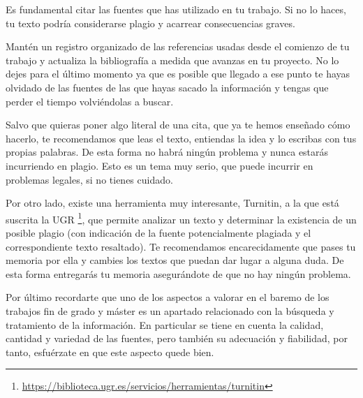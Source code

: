 Es fundamental citar las fuentes que has utilizado en tu trabajo. Si no lo haces, tu texto podría considerarse plagio y acarrear consecuencias graves.

Mantén un registro organizado de las referencias usadas desde el comienzo de tu trabajo y actualiza la bibliografía a medida que avanzas en tu proyecto. No lo dejes para el último momento ya que es posible que llegado a ese punto te hayas olvidado de las fuentes de las que hayas sacado la información y tengas que perder el tiempo volviéndolas a buscar.

Salvo que quieras poner algo literal de una cita, que ya te hemos enseñado cómo hacerlo, te recomendamos que leas el texto, entiendas la idea y lo escribas con tus propias palabras. De esta forma no habrá ningún problema y nunca estarás incurriendo en plagio. Esto es un tema muy serio, que puede incurrir en problemas legales, si no tienes cuidado. 

Por otro lado, existe una herramienta muy interesante, Turnitin, a la que está suscrita la UGR \footnote{\url{https://biblioteca.ugr.es/servicios/herramientas/turnitin}}, que permite analizar un texto y determinar la existencia de un posible plagio (con indicación de la fuente potencialmente plagiada y el correspondiente texto resaltado). Te recomendamos encarecidamente que pases tu memoria por ella y cambies los textos que puedan dar lugar a alguna duda. De esta forma entregarás tu memoria asegurándote de que no hay ningún problema.

Por último recordarte que uno de los aspectos a valorar en el baremo de los trabajos fin de grado y máster es un apartado relacionado con la búsqueda y tratamiento de la información. En particular se tiene en cuenta la calidad, cantidad y variedad de las fuentes, pero también su adecuación y fiabilidad, por tanto, esfuérzate en que este aspecto quede bien.
